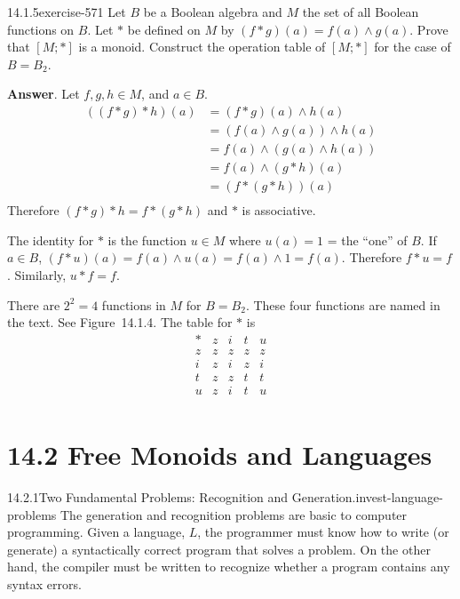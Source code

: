\documentclass[twoside,10pt,]{book}
\numberwithin{equation}{section}
\begin{document}
\begin{divisionsolution}{14.1.5}{}{exercise-571}%
\hypertarget{p-5090}{}%
Let \(B\) be a Boolean algebra and \(M\) the set of all Boolean functions on \(B\). Let \(*\) be defined on \(M\) by \((f * g)(a) = f(a) \land  g(a)\). Prove that \([M;*]\) is a monoid. Construct the operation table of \([M;*]\) for the case of \(B = B_2\).%
\par\smallskip%
\noindent\textbf{Answer}.\quad%
\hypertarget{p-5091}{}%
Let \(f, g, h \in  M\), and \(a \in  B\).%
\begin{equation*}
\begin{split}
((f*g)*h)(a) & = (f*g)(a) \land  h(a)\\
& =  (f(a)\land g(a))\land h(a)\\
& =  f(a) \land ( g(a) \land  h(a))\\
& =  f(a) \land  (g * h)(a)\\
& =  (f * (g * h))(a)\\
\end{split}
\end{equation*}
Therefore \((f * g) * h =f * (g * h)\) and  \(*\) is  associative.%
\par
\hypertarget{p-5092}{}%
The identity for \(*\) is the function \(u \in  M\) where \(u(a) = 1\) = the ``one'' of \(B\). If \(a \in  B\), \((f*u)(a) =f(a)\land u(a) = f(a)\land 1 = f(a)\). Therefore \(f * u = f\). Similarly, \(u * f =f\).%
\par
\hypertarget{p-5093}{}%
There are \(2^2= 4\) functions in \(M\) for \(B = B _2\). These four functions are named in the text. See Figure~14.1.4. The table for \(*\) is%
\begin{equation*}
\begin{array}{c|cccc}
* &  z &  i & t &  u\\
\hline
z &z & z & z & z \\
i &z & i & z & i \\
t &z & z & t & t \\
u &z & i & t & u \\
\end{array}
\end{equation*}
%
\end{divisionsolution}%
\section*{14.2 Free Monoids and Languages}
\begin{investigationsolution}{14.2.1}{Two Fundamental Problems: Recognition and Generation.}{invest-language-problems}%
\hypertarget{p-5124}{}%
The generation and recognition problems are basic to computer programming. Given a language, \(L\), the programmer must know how to write (or generate) a syntactically correct program that solves a problem. On the other hand, the compiler must be written to recognize whether a program contains any syntax errors.%
\end{investigationsolution}%
\end{document}

